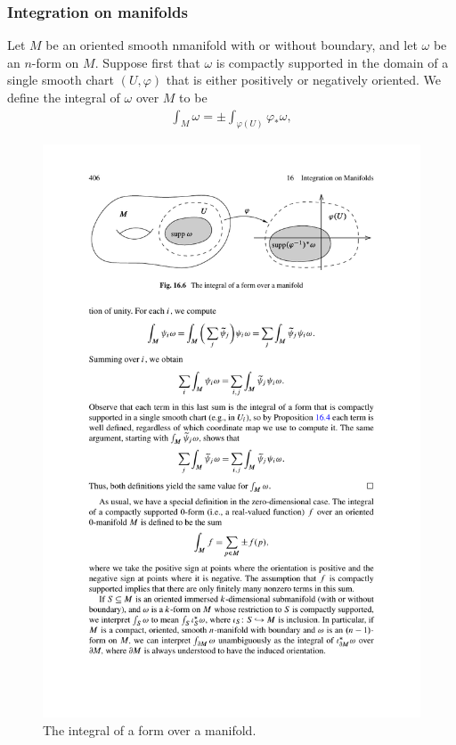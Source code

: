 \subsubsection{Integration on manifolds}
Let $M$ be an oriented smooth nmanifold with or without boundary, and let $\omega$ be an $n$-form on $M$. Suppose first that $\omega$ is compactly supported in the domain of a single smooth chart $(U,\varphi)$ that is either positively or negatively oriented. We define the integral of $\omega$ over $M$ to be
\begin{align}\label{int mani def-1}
\int_M\omega=\pm\int_{\varphi(U)}\varphi_*\omega,
\end{align}
\begin{figure}[htbp]
\centering
\includegraphics{pictures/int-form-onechart}
\caption{The integral of a form over a manifold.}
\end{figure}

